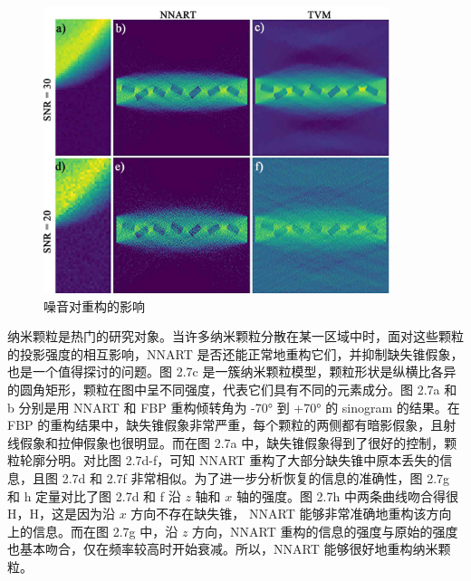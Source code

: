 \begin{figure}[H]
	\vspace{\baselineskip}
	\centering
	\includegraphics[width=0.9\textwidth]{../3.6/361}
	\caption{噪音对重构的影响}\label{fig:36}
	\song{}
\end{figure}

纳米颗粒是热门的研究对象。当许多纳米颗粒分散在某一区域中时，面对这些颗粒的投影强度的相互影响，NNART 是否还能正常地重构它们，并抑制缺失锥假象，也是一个值得探讨的问题。图 2.7c 是一簇纳米颗粒模型，颗粒形状是纵横比各异的圆角矩形，颗粒在图中呈不同强度，代表它们具有不同的元素成分。图 2.7a 和 b 分别是用 NNART 和 FBP 重构倾转角为 -70° 到 +70° 的 sinogram 的结果。在 FBP 的重构结果中，缺失锥假象非常严重，每个颗粒的两侧都有暗影假象，且射线假象和拉伸假象也很明显。而在图 2.7a 中，缺失锥假象得到了很好的控制，颗粒轮廓分明。对比图 2.7d-f，可知 NNART 重构了大部分缺失锥中原本丢失的信息，且图 2.7d 和 2.7f 非常相似。为了进一步分析恢复的信息的准确性，图 2.7g 和 h 定量对比了图 2.7d 和 f 沿 $z$ 轴和 $x$ 轴的强度。图 2.7h 中两条曲线吻合得很H，H，这是因为沿 $x$ 方向不存在缺失锥， NNART 能够非常准确地重构该方向上的信息。而在图 2.7g 中，沿 $z$ 方向，NNART 重构的信息的强度与原始的强度也基本吻合，仅在频率较高时开始衰减。所以，NNART 能够很好地重构纳米颗粒。


